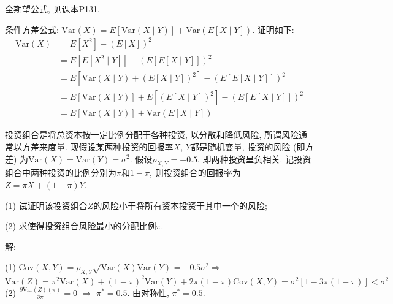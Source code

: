 \documentclass[standard]{ExBook}
\renewenvironment{shaded}{%
  \def\FrameCommand{\fboxsep=\FrameSep \colorbox{shadecolor}}%
  \MakeFramed{\advance\hsize-\width \FrameRestore}%
}{%
  \endMakeFramed
}
\begin{document}
\begin{qitems}
\textcolor{themeColor}{\selectfont {} 全期望公式, 见课本P131.}

\textcolor{themeColor}{\selectfont {} 条件方差公式: $\text{Var}(X) = E[\text{Var}(X \mid Y)] + \text{Var}(E[X \mid Y])$. 证明如下:
\[
\begin{aligned}
\text{Var}(X) &= E[X^2] - (E[X])^2 \\
&= E[E[X^2 \mid Y]] - (E[E[X \mid Y]])^2 \\
&= E[\text{Var}(X \mid Y) + (E[X \mid Y])^2] - (E[E[X \mid Y]])^2 \\
&= E[\text{Var}(X \mid Y)] + E[(E[X \mid Y])^2] - (E[E[X \mid Y]])^2 \\
&= E[\text{Var}(X \mid Y)] + \text{Var}(E[X \mid Y])
\end{aligned}
\]}

\vspace{2.5cm-5em}

    \begin{bbox}
    \begin{shaded}
        \qitem
投资组合是将总资本按一定比例分配于各种投资, 以分散和降低风险, 所谓风险通常以方差来度量. 现假设某两种投资的回报率$X$, $Y$都是随机变量, 投资的风险 (即方差) 为$\mathrm{Var}(X)=\mathrm{Var}(Y)=\sigma^2$. 假设$\rho_{X,Y}=-0.5$, 即两种投资呈负相关. 记投资组合中两种投资的比例分别为$\pi$和$1-\pi$, 则投资组合的回报率为$Z=\pi X+(1-\pi)Y$.

(1) 试证明该投资组合$Z$的风险小于将所有资本投资于其中一个的风险;

(2) 求使得投资组合风险最小的分配比例$\pi$.
    \end{shaded}
    \end{bbox}

\vspace{\dimexpr2.5cm-5em\relax}

解: 

(1) $\mathrm{Cov}(X,Y)=\rho_{X,Y}\sqrt{\mathrm{Var}(X)\mathrm{Var}(Y)}=-0.5\sigma^2 \Longrightarrow$
$$\mathrm{Var}(Z)=\pi^2 \mathrm{Var}(X)+(1-\pi)^2 \mathrm{Var}(Y)+2\pi(1-\pi)\mathrm{Cov}(X,Y)=\sigma^2\left[1-3\pi(1-\pi)\right]<\sigma^2$$
(2)  $\displaystyle\frac{\partial \mathrm{Var}(Z)(\pi)}{\partial\pi}=0$ $\Longrightarrow$ $\pi^*=0.5$. \qquad {} 由对称性, $\pi^*=0.5$.

\vspace{2.5cm-5em}

    \begin{bbox}
    \begin{shaded}
        \qitem


\end{shaded}
\end{bbox}
\end{qitems}
\end{document}
